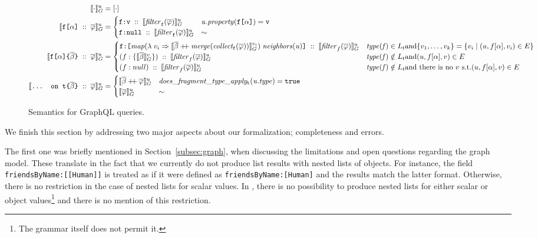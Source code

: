 \begin{figure}
    \centering
    \begin{align}
    \llbracket \cdot \rrbracket^{u}_{G} &= [\cdot] \\
    \llbracket \texttt{f[}\alpha\texttt{]}\; ::\; \overline{\varphi} \rrbracket^{u}_{G} &= \begin{cases}
    \texttt{f}\texttt{:}\texttt{v} \; ::\; \llbracket \mathit{filter}_{\texttt{f}}(\overline{\varphi}) \rrbracket^{u}_{G}  & \mathit{u.property}(\texttt{f[}\alpha\texttt{]}) = \texttt{v} \\
    \texttt{f}\texttt{:}\texttt{null} \; :: \; \llbracket \mathit{filter}_{\texttt{f}}(\overline{\varphi}) \rrbracket^{u}_{G} & \sim
    \end{cases}\\
    \llbracket \texttt{f[}\alpha\texttt{]} \texttt{\{}\overline{\beta}\texttt{\}} \; ::\; \overline{\varphi} \rrbracket^{u}_{G} &=
    \begin{cases}
    \texttt{f}\texttt{:}\texttt{[} \mathit{map} (\lambda\; v_{i} \Rightarrow \llbracket \overline{\beta} \mathbin{+\mkern-5mu+} \mathit{merge (collect_{\texttt{f}} (\overline{\varphi}))} \rrbracket^{v_{i}}_{G})\; \mathit{neighbors(u)} \texttt{]} \; :: \; \llbracket \mathit{filter}_{f}(\overline{\varphi}) \rrbracket^{u}_{G}  & \mathit{type(f)} \in L_{t} \text{and} \{v_{1}, \ldots, v_{k}\} = \{v_{i} \mid (u, f[\alpha], v_{i}) \in E\} \\
    (f:\{\llbracket \overline{\beta} \rrbracket^{v}_{G}\})\; :: \; \llbracket \mathit{filter}_{f}(\overline{\varphi}) \rrbracket^{u}_{G}  & \mathit{type(f)} \notin L_{t} \text{and} (u, f[\alpha], v) \in E \\
    (f:null)\; :: \; \llbracket \mathit{filter}_{f}(\overline{\varphi}) \rrbracket^{u}_{G} & \mathit{type(f)} \notin L_{t} \text{and there is no } v \text{ s.t.} (u, f[\alpha], v) \in E \\
    \end{cases}\\
    \llbracket \texttt{... on t}\texttt{\{}\overline{\beta}\texttt{\}}\; ::\; \overline{\varphi} \rrbracket^{u}_{G} &= \begin{cases}
    \llbracket \overline{\beta} \mathbin{+\mkern-5mu+} \overline{\varphi} \rrbracket^{u}_{G} & \mathit{does\_fragment\_type\_apply_{\texttt{t}}(u.type)} = \texttt{true}\\
    \llbracket \overline{\varphi} \rrbracket^{u}_{G} & \sim
    \end{cases}
    \end{align}
    \caption{Semantics for GraphQL queries.}
    \label{fig:semantics}
\end{figure}

We finish this section by addressing two major aspects about our formalization; completeness and errors.

The first one was briefly mentioned in Section~\ref{subsec:graph}, when discussing the limitations and open questions regarding the graph model. These translate in the fact that we currently do not produce list results with nested lists of objects. For instance, the field \texttt{friendsByName:[[Human]]} is treated as if it were defined as \texttt{friendsByName:[Human]} and the results match the latter format. Otherwise, there is no restriction in the case of nested lists for scalar values. In \HP{}, there is no possibility to produce nested lists for either scalar or object values\footnote{The grammar itself does not permit it.} and there is no mention of this restriction.

